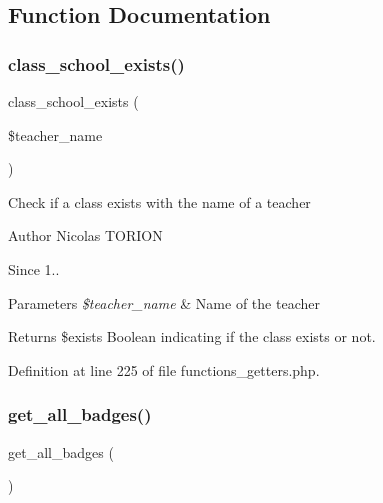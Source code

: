 \subsection{Function Documentation}
\mbox{\label{functions__getters_8php_a06549af6ed538e2854ac6977399f4736}} 
\subsubsection{\texorpdfstring{class\+\_\+school\+\_\+exists()}{class\_school\_exists()}}
{\footnotesize\ttfamily class\+\_\+school\+\_\+exists (\begin{DoxyParamCaption}\item[{}]{\$teacher\+\_\+name }\end{DoxyParamCaption})}

Check if a class exists with the name of a teacher

\begin{DoxyAuthor}{Author}
Nicolas T\+O\+R\+I\+ON 
\end{DoxyAuthor}
\begin{DoxySince}{Since}
1.. 
\end{DoxySince}

\begin{DoxyParams}{Parameters}
{\em \$teacher\+\_\+name} & Name of the teacher \\
\hline
\end{DoxyParams}
\begin{DoxyReturn}{Returns}
\$exists Boolean indicating if the class exists or not. 
\end{DoxyReturn}


Definition at line 225 of file functions\+\_\+getters.\+php.

\mbox{\label{functions__getters_8php_a8e4b9c0ac59627ef8f3ed4ee586b0542}} 
\subsubsection{\texorpdfstring{get\+\_\+all\+\_\+badges()}{get\_all\_badges()}}
{\footnotesize\ttfamily get\+\_\+all\+\_\+badges (\begin{DoxyParamCaption}{ }\end{DoxyParamCaption})}

